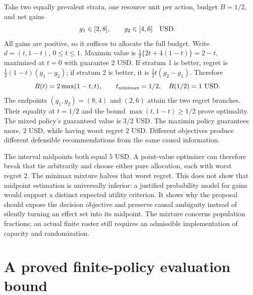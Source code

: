 Take two equally prevalent strata, one resource unit per action, budget
$B=1/2$, and net gains
\[
 g_1\in[2,8],\qquad g_2\in[4,6]\quad {\rm USD}.
\]
All gains are positive, so it suffices to allocate the full budget. Write
$d=(t,1-t)$, $0\leq t\leq1$. Maximin value is
$\tfrac12\{2t+4(1-t)\}=2-t$, maximized at $t=0$ with guarantee $2$ USD.
If stratum 1 is better, regret is
$\tfrac12(1-t)(g_1-g_2)$; if stratum 2 is better, it is
$\tfrac12t(g_2-g_1)$. Therefore
\begin{equation}
 R(t)=2\max(1-t,t),\qquad t_{\rm minimax}=1/2,\quad R(1/2)=1\ {\rm USD}.
 \label{exec17:s4-robust-example}
\end{equation}
The endpoints $(g_1,g_2)=(8,4)$ and $(2,6)$ attain the two regret branches.
Their equality at $t=1/2$ and the bound
$\max(t,1-t)\geq1/2$ prove optimality. The mixed policy's guaranteed value
is $3/2$ USD. The maximin policy guarantees more, $2$ USD, while having
worst regret $2$ USD. Different objectives produce different defensible
recommendations from the same causal information.~\citep{exec17_s4_extension}

The interval midpoints both equal $5$ USD. A point-value optimizer can
therefore break that tie arbitrarily and choose either pure allocation,
each with worst regret $2$. The minimax mixture halves that worst regret.
This does not show that midpoint estimation is universally inferior:
a justified probability model for gains would support a distinct expected
utility criterion. It shows why the proposal should expose the decision
objective and preserve causal ambiguity instead of silently turning an
effect set into its midpoint. The mixture concerns population fractions;
an actual finite roster still requires an admissible implementation of
capacity and randomization.

\section{A proved finite-policy evaluation bound}
\label{exec17:s4-finite-policy}

